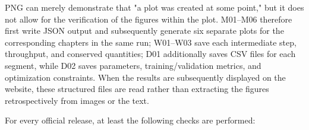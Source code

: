 \documentclass[11pt,a4paper,openany]{book}
\numberwithin{equation}{chapter}
\numberwithin{figure}{chapter}
\numberwithin{table}{chapter}
\begin{document}
PNG can merely demonstrate that "a plot was created at some point," but it does not allow for the verification of the figures within the plot. M01–M06 therefore first write JSON output and subsequently generate six separate plots for the corresponding chapters in the same run; W01–W03 save each intermediate step, throughput, and conserved quantities; D01 additionally saves CSV files for each segment, while D02 saves parameters, training/validation metrics, and optimization constraints. When the results are subsequently displayed on the website, these structured files are read rather than extracting the figures retrospectively from images or the text.




For every official release, at least the following checks are performed:
\end{document}
